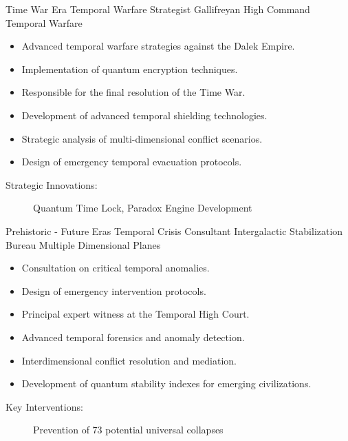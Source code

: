 \cventry
{Time War Era}%
{Temporal Warfare Strategist}%
{Gallifreyan High Command}%
{Temporal Warfare}%
{%
  \begin{itemize}
    \item Advanced temporal warfare strategies against the Dalek Empire.
    \item Implementation of quantum encryption techniques.
    \item Responsible for the final resolution of the Time War.
    \item Development of advanced temporal shielding technologies.
    \item Strategic analysis of multi-dimensional conflict scenarios.
    \item Design of emergency temporal evacuation protocols.
  \end{itemize}
}{%
  \begin{description}%
    \item[Strategic Innovations:] Quantum Time Lock, Paradox Engine Development
  \end{description}%
}

\begin{cvsubentries}
  \cvsubentry
  {Prehistoric - Future Eras}%
  {Temporal Crisis Consultant}%
  {Intergalactic Stabilization Bureau}%
  {Multiple Dimensional Planes}%
  {%
    \begin{itemize}
      \item Consultation on critical temporal anomalies.
      \item Design of emergency intervention protocols.
      \item Principal expert witness at the Temporal High Court.
      \item Advanced temporal forensics and anomaly detection.
      \item Interdimensional conflict resolution and mediation.
      \item Development of quantum stability indexes for emerging civilizations.
    \end{itemize}
  }{%
    \begin{description}%
      \item[Key Interventions:] Prevention of 73 potential universal collapses
    \end{description}%
  }
\end{cvsubentries}

